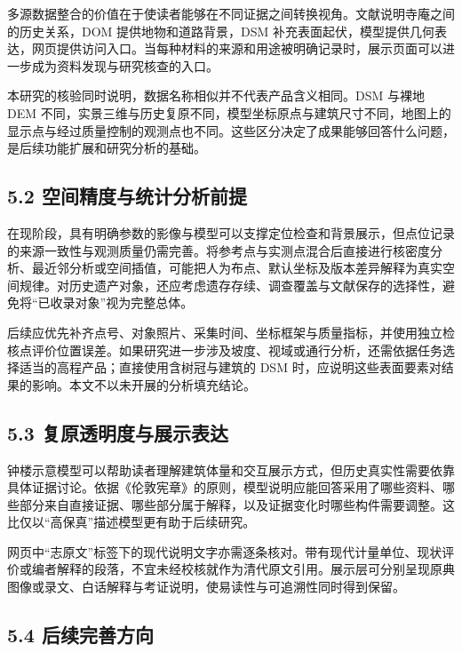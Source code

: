 \documentclass[UTF8,a4paper,zihao=-4]{ctexart}
\begin{document}
多源数据整合的价值在于使读者能够在不同证据之间转换视角。文献说明寺庵之间的历史关系，DOM 提供地物和道路背景，DSM 补充表面起伏，模型提供几何表达，网页提供访问入口。当每种材料的来源和用途被明确记录时，展示页面可以进一步成为资料发现与研究核查的入口。


本研究的核验同时说明，数据名称相似并不代表产品含义相同。DSM 与裸地 DEM 不同，实景三维与历史复原不同，模型坐标原点与建筑尺寸不同，地图上的显示点与经过质量控制的观测点也不同。这些区分决定了成果能够回答什么问题，是后续功能扩展和研究分析的基础。


\subsection*{5.2 空间精度与统计分析前提}

在现阶段，具有明确参数的影像与模型可以支撑定位检查和背景展示，但点位记录的来源一致性与观测质量仍需完善。将参考点与实测点混合后直接进行核密度分析、最近邻分析或空间插值，可能把人为布点、默认坐标及版本差异解释为真实空间规律。对历史遗产对象，还应考虑遗存存续、调查覆盖与文献保存的选择性，避免将“已收录对象”视为完整总体。


后续应优先补齐点号、对象照片、采集时间、坐标框架与质量指标，并使用独立检核点评价位置误差。如果研究进一步涉及坡度、视域或通行分析，还需依据任务选择适当的高程产品；直接使用含树冠与建筑的 DSM 时，应说明这些表面要素对结果的影响。本文不以未开展的分析填充结论。


\subsection*{5.3 复原透明度与展示表达}

钟楼示意模型可以帮助读者理解建筑体量和交互展示方式，但历史真实性需要依靠具体证据讨论。依据《伦敦宪章》的原则，模型说明应能回答采用了哪些资料、哪些部分来自直接证据、哪些部分属于解释，以及证据变化时哪些构件需要调整\cite{r5}。这比仅以“高保真”描述模型更有助于后续研究。


网页中“志原文”标签下的现代说明文字亦需逐条核对。带有现代计量单位、现状评价或编者解释的段落，不宜未经校核就作为清代原文引用。展示层可分别呈现原典图像或录文、白话解释与考证说明，使易读性与可追溯性同时得到保留。


\subsection*{5.4 后续完善方向}
\end{document}
